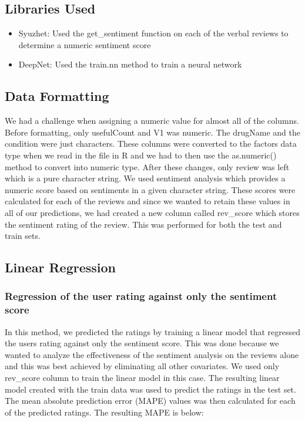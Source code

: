\documentclass{article}
\begin{document}
\subsection {Libraries Used}
\begin{itemize}
    \item Syuzhet: Used the get\_sentiment function on each of the verbal reviews to determine a numeric sentiment score
    \item DeepNet: Used the train.nn method to train a neural network
\end{itemize}

\subsection{Data Formatting}


We had a challenge when assigning a numeric value for almost all of the columns. Before formatting, only usefulCount and V1 was numeric. The drugName and the condition were just characters. These columns were converted to the factors data type when we read in the file in R and we had to then use the as.numeric() method to convert into numeric type. After these changes, only review was left which is a pure character string. We used sentiment analysis which provides a numeric score based on sentiments in a given character string. These scores were calculated for each of the reviews and since we wanted to retain these values in all of our predictions, we had created a new column called rev\_score which stores the sentiment rating of the review. This was performed for both the test and train sets.

\subsection{Linear Regression}
\subsubsection{Regression of the user rating against only the sentiment score}

 
 In this method, we predicted the ratings by training a linear model that regressed the users rating against only the sentiment score. This was done because we wanted to analyze the effectiveness of the sentiment analysis on the reviews alone and this was best achieved by eliminating all other covariates. We used only rev\_score column to train the linear model in this case. The resulting linear model created with the train data was used to predict the ratings in the test set. The mean absolute prediction error (MAPE) values was then calculated for each of the predicted ratings. The resulting MAPE is below: 
\end{document}
